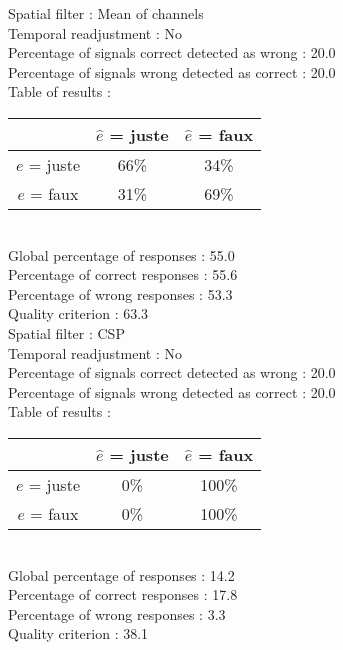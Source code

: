 Spatial filter : Mean of channels \\
Temporal readjustment : No \\
Percentage of signals correct detected as wrong :   20.0 \\
Percentage of signals wrong detected as correct :   20.0 \\
Table of results : \\
\begin{tabular}{|c|c|c|}
\hline				& $\hat{e}$ = juste & $\hat{e}$ = faux \\
\hline  $e$ = juste	&     66\%			&     34\%		\\
\hline  $e$ = faux	&     31\%			&     69\%		\\
\hline
\end{tabular}\\
Global percentage of responses :   55.0 \\
Percentage of correct responses :   55.6 \\
Percentage of wrong responses :   53.3 \\
Quality criterion :   63.3 \\

Spatial filter : CSP \\
Temporal readjustment : No \\
Percentage of signals correct detected as wrong :   20.0 \\
Percentage of signals wrong detected as correct :   20.0 \\
Table of results : \\
\begin{tabular}{|c|c|c|}
\hline				& $\hat{e}$ = juste & $\hat{e}$ = faux \\
\hline  $e$ = juste	&      0\%			&    100\%		\\
\hline  $e$ = faux	&      0\%			&    100\%		\\
\hline
\end{tabular}\\
Global percentage of responses :   14.2 \\
Percentage of correct responses :   17.8 \\
Percentage of wrong responses :    3.3 \\
Quality criterion :   38.1 \\

